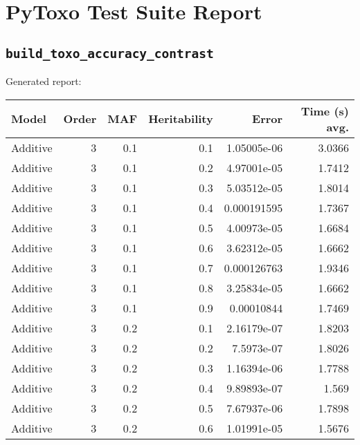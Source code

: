 \documentclass{article}
\begin{document}
\section*{PyToxo Test Suite Report}
\subsection*{\texttt{build\_toxo\_accuracy\_contrast}}
Generated report:

\begin{longtable}[H]{lrrrrr}
\hline
 Model          &   Order &   MAF &   Heritability &         Error &   Time (s) avg. \\
\hline
 Additive       &       3 &   0.1 &            0.1 &   1.05005e-06 &          3.0366 \\
 Additive       &       3 &   0.1 &            0.2 &   4.97001e-05 &          1.7412 \\
 Additive       &       3 &   0.1 &            0.3 &   5.03512e-05 &          1.8014 \\
 Additive       &       3 &   0.1 &            0.4 &   0.000191595 &          1.7367 \\
 Additive       &       3 &   0.1 &            0.5 &   4.00973e-05 &          1.6684 \\
 Additive       &       3 &   0.1 &            0.6 &   3.62312e-05 &          1.6662 \\
 Additive       &       3 &   0.1 &            0.7 &   0.000126763 &          1.9346 \\
 Additive       &       3 &   0.1 &            0.8 &   3.25834e-05 &          1.6662 \\
 Additive       &       3 &   0.1 &            0.9 &   0.00010844  &          1.7469 \\
 Additive       &       3 &   0.2 &            0.1 &   2.16179e-07 &          1.8203 \\
 Additive       &       3 &   0.2 &            0.2 &   7.5973e-07  &          1.8026 \\
 Additive       &       3 &   0.2 &            0.3 &   1.16394e-06 &          1.7788 \\
 Additive       &       3 &   0.2 &            0.4 &   9.89893e-07 &          1.569  \\
 Additive       &       3 &   0.2 &            0.5 &   7.67937e-06 &          1.7898 \\
 Additive       &       3 &   0.2 &            0.6 &   1.01991e-05 &          1.5676 \\

\end{longtable}
\end{document}
